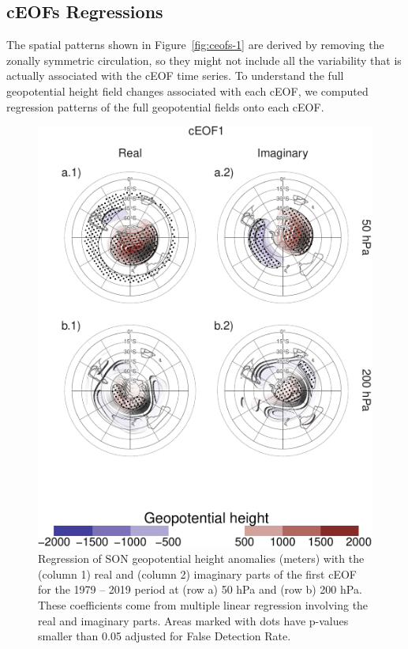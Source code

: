 \documentclass[smallextended]{svjour3}       %
\begin{document}
\hypertarget{regressions}{%
\subsection{cEOFs Regressions}\label{regressions}}

The spatial patterns shown in Figure~\ref{fig:ceofs-1} are derived by removing the zonally symmetric circulation, so they might not include all the variability that is actually associated with the cEOF time series.
To understand the full geopotential height field changes associated with each cEOF, we computed regression patterns of the full geopotential fields onto each cEOF.





\begin{figure}
\centering
\includegraphics{../figures/eof1-regr-gh-1.pdf}
\caption{\label{fig:eof1-regr-gh}Regression of SON geopotential height anomalies (meters) with the (column 1) real and (column 2) imaginary parts of the first cEOF for the 1979 -- 2019 period at (row a) 50 hPa and (row b) 200 hPa.
These coefficients come from multiple linear regression involving the real and imaginary parts.
Areas marked with dots have p-values smaller than 0.05 adjusted for False Detection Rate.}
\end{figure}
\end{document}
